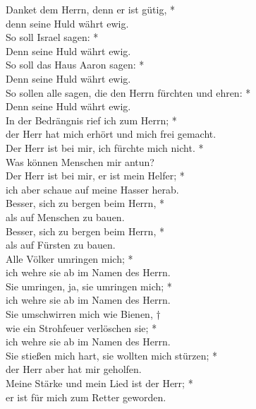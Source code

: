 \noindent Danket dem Herrn, denn er ist gütig, *\\ denn seine Huld währt ewig.\\
\vin So soll Israel sagen: *\\
\vin Denn seine Huld währt ewig.\\
So soll das Haus Aaron sagen: *\\ Denn seine Huld währt ewig.\\
\vin So sollen alle sagen, die den Herrn fürchten und ehren: * \\ \vin Denn seine Huld währt ewig.\\
In der Bedrängnis rief ich zum Herrn; * \\der Herr hat mich erhört und mich frei gemacht.\\
\vin Der Herr ist bei mir, ich fürchte mich nicht. *\\  \vin Was können Menschen mir antun?\\
Der Herr ist bei mir, er ist mein Helfer; *\\ ich aber schaue auf meine Hasser herab.\\
\vin Besser, sich zu bergen beim Herrn, *\\ als auf Menschen zu bauen.\\
Besser, sich zu bergen beim Herrn, *\\ \vin als auf Fürsten zu bauen.\\
\vin  Alle Völker umringen mich; *\\ ich wehre sie ab im Namen des Herrn.\\
Sie umringen, ja, sie umringen mich; *\\ \vin ich wehre sie ab im Namen des Herrn.\\
\vin Sie umschwirren mich wie Bienen, † \\wie ein Strohfeuer verlöschen sie; *\\ ich wehre sie ab im Namen des Herrn.\\
 Sie stießen mich hart, sie wollten mich stürzen; *\\ \vin der Herr aber hat mir geholfen.\\
\vin Meine Stärke und mein Lied ist der Herr; *\\ er ist für mich zum Retter geworden.\\


\def\greinitialformat#1{{\fontsize{40}{40}\selectfont #1}}
\gresetfirstlineaboveinitial{\small \textcolor{red}{ Ps 118b}}{}
\setaboveinitialseparation{0.72mm}


